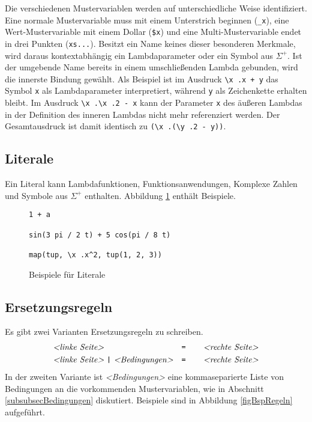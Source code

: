 Die verschiedenen Mustervariablen werden auf unterschiedliche Weise identifiziert. Eine normale Mustervariable muss mit einem Unterstrich beginnen (\verb|_x|), eine Wert-Mustervariable mit einem Dollar (\verb|$x|) und eine Multi-Mustervariable endet in drei Punkten (\verb|xs...|). Besitzt ein Name keines dieser besonderen Merkmale, wird daraus kontextabhängig ein Lambdaparameter oder ein Symbol aus $\Sigma^+$. Ist der umgebende Name bereits in einem umschließenden Lambda gebunden, wird die innerste Bindung gewählt. Als Beispiel ist im Ausdruck \verb|\x .x + y| das Symbol \verb|x| als Lambdaparameter interpretiert, während \verb|y| als Zeichenkette erhalten bleibt.
Im Ausdruck \verb|\x .\x .2 - x| kann der Parameter \verb|x| des äußeren Lambdas in der Definition des inneren Lambdas nicht mehr referenziert werden. Der Gesamtausdruck ist damit identisch zu \verb|(\x .(\y .2 - y))|.

\subsection{Literale}
Ein Literal kann Lambdafunktionen, Funktionsanwendungen, Komplexe Zahlen und Symbole aus $\Sigma^+$ enthalten. Abbildung \ref{figBspLit} enthält Beispiele.

\begin{figure}
\begin{unbreakable}\begin{verbatim}
1 + a

sin(3 pi / 2 t) + 5 cos(pi / 8 t)

map(tup, \x .x^2, tup(1, 2, 3))
\end{verbatim}\end{unbreakable}
\caption{Beispiele für Literale}
\label{figBspLit}
\end{figure}

\subsection{Ersetzungsregeln}
Es gibt zwei Varianten Ersetzungsregeln zu schreiben.
\begin{align*}
	~&~&~&~&\textit{<linke Seite>}&~ ~                       &\verb~=    ~ \textit{<rechte Seite>}&~&~&~&~\\
	~&~&~&~&\textit{<linke Seite>}&~\verb~|~~\textit{<Bedingungen>} &\verb~=    ~ \textit{<rechte Seite>}&~&~&~&~
\end{align*}
In der zweiten Variante ist \textit{<Bedingungen>} eine kommaseparierte Liste von Bedingungen an die vorkommenden Mustervariablen, wie in Abschnitt \ref{subsubsecBedingungen} diskutiert. 
Beispiele sind in Abbildung \ref{figBspRegeln} aufgeführt.

